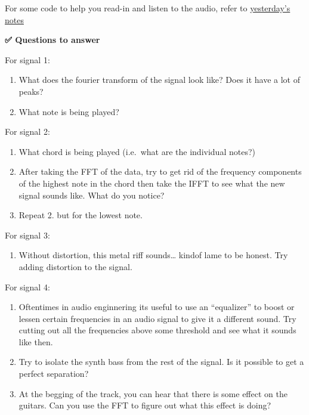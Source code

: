 For some code to help you read-in and listen to the audio, refer to
\href{https://dannycaballero.info/phy415fall23/content/3_waves/notes-Using-FFTs.html}{yesterday's
notes}

\textbf{✅ Questions to answer}

For signal 1:

\begin{enumerate}
\def\labelenumi{\arabic{enumi}.}
\tightlist
\item
  What does the fourier transform of the signal look like? Does it have
  a lot of peaks?
\item
  What note is being played?
\end{enumerate}

For signal 2:

\begin{enumerate}
\def\labelenumi{\arabic{enumi}.}
\tightlist
\item
  What chord is being played (i.e.~what are the individual notes?)
\item
  After taking the FFT of the data, try to get rid of the frequency
  components of the highest note in the chord then take the IFFT to see
  what the new signal sounds like. What do you notice?
\item
  Repeat 2. but for the lowest note.
\end{enumerate}

For signal 3:

\begin{enumerate}
\def\labelenumi{\arabic{enumi}.}
\tightlist
\item
  Without distortion, this metal riff sounds\ldots{} kindof lame to be
  honest. Try adding distortion to the signal.
\end{enumerate}

For signal 4:

\begin{enumerate}
\def\labelenumi{\arabic{enumi}.}
\tightlist
\item
  Oftentimes in audio enginnering its useful to use an ``equalizer'' to
  boost or lessen certain frequencies in an audio signal to give it a
  different sound. Try cutting out all the frequencies above some
  threshold and see what it sounds like then.
\item
  Try to isolate the synth bass from the rest of the signal. Is it
  possible to get a perfect separation?
\item
  At the begging of the track, you can hear that there is some effect on
  the guitars. Can you use the FFT to figure out what this effect is
  doing?
\end{enumerate}

\begin{Shaded}
\begin{Highlighting}[]
\end{Highlighting}
\end{Shaded}
